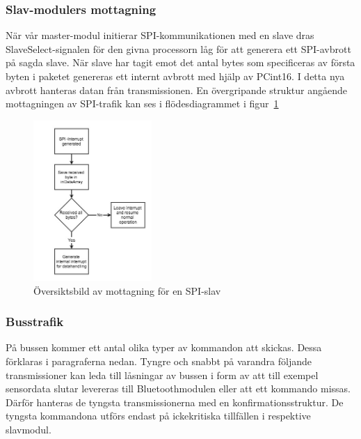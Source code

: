\documentclass[a4paper,12pt,fleqn]{article}
\begin{document}
\subsubsection{Slav-modulers mottagning}
När vår master-modul initierar SPI-kommunikationen med en slave dras SlaveSelect-signalen för den givna processorn låg för att generera ett SPI-avbrott på sagda slave. När slave har tagit emot det antal bytes som specificeras av första byten i paketet genereras ett internt avbrott med hjälp av PCint16. I detta nya avbrott hanteras datan från transmissionen. En övergripande struktur angående mottagningen av SPI-trafik kan ses i flödesdiagrammet i figur~\ref{fig:spislave}

\begin{figure}[htp] %
  \begin{center}
  \includegraphics[keepaspectratio=true,width=0.4\textwidth]{bilder/spislaverec.jpg}  %
  \end{center}
  \caption{Översiktsbild av mottagning för en SPI-slav} %
  \label{fig:spislave}
\end{figure}

\subsubsection{Busstrafik}
På bussen kommer ett antal olika typer av kommandon att skickas. Dessa förklaras i paragraferna nedan. 
Tyngre och snabbt på varandra följande transmissioner kan leda till låsningar av bussen i form av att till exempel sensordata slutar levereras till Bluetoothmodulen eller att ett kommando missas. Därför hanteras de tyngsta transmissionerna med en konfirmationsstruktur.
De tyngsta kommandona utförs endast på ickekritiska tillfällen i respektive slavmodul.
\end{document}
